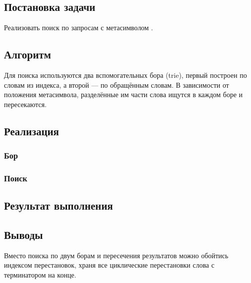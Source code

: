 \documentclass[a4paper, 12pt]{article}
\begin{document}

\newpage


\subsection*{Постановка задачи}
Реализовать поиск по запросам с метасимволом \*.

\subsection*{Алгоритм}
Для поиска используются два вспомогательных бора (trie), первый построен по словам из индекса, а второй --- по обращённым словам. В зависимости от положения метасимвола, разделённые им части слова ищутся в каждом боре и пересекаются.

\subsection*{Реализация}
\subsubsection*{Бор}


\subsubsection*{Поиск}



\subsection*{Результат выполнения}



\subsection*{Выводы}
Вместо поиска по двум борам и пересечения результатов можно обойтись индексом перестановок, храня все циклические перестановки слова с терминатором на конце.
\end{document}

